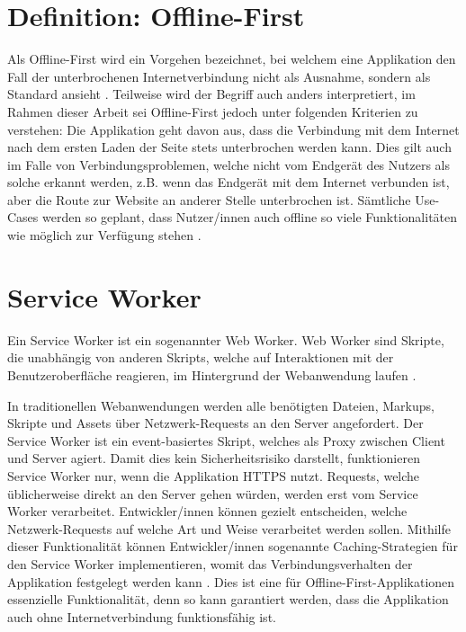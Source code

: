\documentclass[a4paper, 12pt]{scrreprt}
\begin{document}
\section{Definition: Offline-First}\label{sec:DefinitionOfflineFirst}
Als Offline-First wird ein Vorgehen bezeichnet, bei welchem eine Applikation den Fall der unterbrochenen Internetverbindung nicht als Ausnahme, sondern als Standard ansieht \autocite{OnlineGoogleProgressiveWebApps}. Teilweise wird der Begriff auch anders interpretiert, im Rahmen dieser Arbeit sei Offline-First jedoch unter folgenden Kriterien zu verstehen: Die Applikation geht davon aus, dass die Verbindung mit dem Internet nach dem ersten Laden der Seite stets unterbrochen werden kann. Dies gilt auch im Falle von Verbindungsproblemen, welche nicht vom Endgerät des Nutzers als solche erkannt werden, z.B. wenn das Endgerät mit dem Internet verbunden ist, aber die Route zur Website an anderer Stelle unterbrochen ist. Sämtliche Use-Cases werden so geplant, dass Nutzer/innen auch offline so viele Funktionalitäten wie möglich zur Verfügung stehen \autocite{ArticleDesigningOfflineFirst}. 



\section{Service Worker}
\label{sec:serviceworker}

Ein Service Worker ist ein sogenannter Web Worker. Web Worker sind Skripte, die unabhängig von anderen Skripts, welche auf Interaktionen mit der Benutzeroberfläche reagieren, im Hintergrund der Webanwendung laufen \autocite{OnlineHTTPWorker}.

In traditionellen Webanwendungen werden alle benötigten Dateien, Markups, Skripte und Assets über Netzwerk-Requests an den Server angefordert. Der Service Worker ist ein event-basiertes Skript, welches als Proxy zwischen Client und Server agiert. Damit dies kein Sicherheitsrisiko darstellt, funktionieren Service Worker nur, wenn die Applikation \ac{HTTPS} nutzt. Requests, welche üblicherweise direkt an den Server gehen würden, werden erst vom Service Worker verarbeitet. Entwickler/innen können gezielt entscheiden, welche Netzwerk-Requests auf welche Art und Weise verarbeitet werden sollen. Mithilfe dieser Funktionalität können Entwickler/innen sogenannte Caching-Strategien für den Service Worker implementieren, womit das Verbindungsverhalten der Applikation festgelegt werden kann \autocite{OnlineServiceWorkersAnIntroduction}. Dies ist eine für Offline-First-Applikationen essenzielle Funktionalität, denn so kann garantiert werden, dass die Applikation auch ohne Internetverbindung funktionsfähig ist. 
\end{document}
